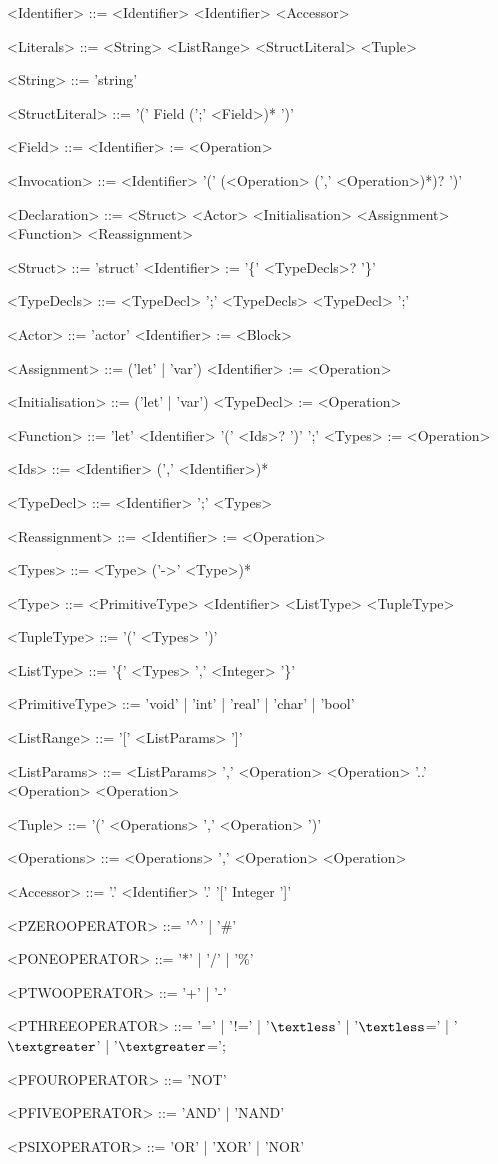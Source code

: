 \begin{grammar}
<Identifier> ::= <Identifier>
 \alt <Identifier> <Accessor>

<Literals> ::= <String>
 \alt <ListRange>
 \alt <StructLiteral>
 \alt <Tuple>

<String> ::= 'string'

<StructLiteral> ::= '(' Field (';' <Field>)* ')'

<Field> ::= <Identifier> := <Operation> 

<Invocation> ::= <Identifier> '(' (<Operation> (',' <Operation>)*)? ')'

<Declaration> ::= <Struct>
 \alt <Actor>
 \alt <Initialisation>
 \alt <Assignment>
 \alt <Function>
 \alt <Reassignment>

<Struct> ::= 'struct' <Identifier> := '\{' <TypeDecls>? '\}'

<TypeDecls> ::= <TypeDecl> ';' <TypeDecls>
 \alt <TypeDecl> ';'

<Actor> ::= 'actor' <Identifier> := <Block>

<Assignment> ::= ('let' | 'var') <Identifier> := <Operation>

<Initialisation> ::= ('let' | 'var') <TypeDecl> := <Operation>

<Function> ::= 'let' <Identifier> '(' <Ids>? ')' ';' <Types> := <Operation>

<Ids> ::= <Identifier> (',' <Identifier>)*

<TypeDecl> ::= <Identifier> ';' <Types>

<Reassignment> ::= <Identifier> := <Operation>

<Types> ::= <Type> ('->' <Type>)*

<Type> ::= <PrimitiveType>
 \alt <Identifier>
 \alt <ListType>
 \alt <TupleType>

<TupleType> ::= '(' <Types> ')'

<ListType> ::= '\{' <Types> ',' <Integer> '\}'

<PrimitiveType> ::= 'void' | 'int' | 'real' | 'char' | 'bool'

<ListRange> ::= '[' <ListParams> ']'

<ListParams> ::= <ListParams> ',' <Operation>
 \alt <Operation> '..' <Operation>
 \alt <Operation>

<Tuple> ::= '(' <Operations> ',' <Operation> ')'

<Operations> ::= <Operations> ',' <Operation>
 \alt <Operation>

<Accessor> ::= '.' <Identifier>
 \alt '.' '[' Integer ']'

<PZEROOPERATOR> ::= '$\mathbin{^\wedge{}}$' | '\#'

<PONEOPERATOR> ::= '*' | '/' | '\%'

<PTWOOPERATOR> ::= '+' | '-'

<PTHREEOPERATOR> ::= '=' | '!=' | '$\textless$' | '$\textless$=' | '$\textgreater$' | '$\textgreater$=';

<PFOUROPERATOR> ::= 'NOT'

<PFIVEOPERATOR> ::= 'AND' | 'NAND'

<PSIXOPERATOR> ::= 'OR' | 'XOR' | 'NOR'

\end{grammar}